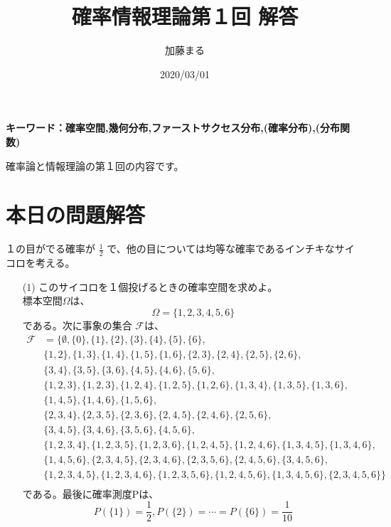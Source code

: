 \documentclass[a4j,uplatex]{jsarticle}
\title{確率情報理論第１回 解答}
\author{加藤まる}
\date{2020/03/01}
\begin{document}
\maketitle
\bf キーワード：確率空間,幾何分布,ファーストサクセス分布,(確率分布),(分布関数)
\par \rm 確率論と情報理論の第１回の内容です。

\section*{本日の問題解答}
１の目がでる確率が $\frac{1}{2}$ で、他の目については均等な確率であるインチキなサイコロを考える。
\begin{itemize}
  \item[(1)] このサイコロを１個投げるときの確率空間を求めよ。 
  \\ 
  標本空間$\Omega $は、
  \begin{equation}
    \Omega = \{ 1,2,3,4,5,6 \} 
  \end{equation}
  である。次に事象の集合 $\mathscr F$は、
  \begin{equation}
    \begin{split}
       \mathscr F &= \{ \emptyset,\{ 0 \},\{ 1\},\{ 2\},\{ 3\},\{ 4\},\{ 5\},\{ 6\},\\
      &\{ 1,2\},\{ 1,3\},\{ 1,4\},\{ 1,5\},\{ 1,6\},\{ 2,3\},\{ 2,4\},\{ 2,5\},\{ 2,6\},\\
      &\{ 3,4\},\{ 3,5\},\{ 3,6\},\{ 4,5\},\{ 4,6\},\{ 5,6\},\\
      &\{ 1,2,3\},\{ 1,2,3\},\{ 1,2,4\},\{ 1,2,5\},\{ 1,2,6\},\{ 1,3,4\},\{ 1,3,5\},\{ 1,3,6\},\\
      &\{ 1,4,5\},\{ 1,4,6\},\{ 1,5,6\},\\
      &\{ 2,3,4\},\{ 2,3,5\},\{ 2,3,6\},\{ 2,4,5\},\{ 2,4,6\},\{ 2,5,6\},\\
      &\{ 3,4,5\},\{ 3,4,6\},\{ 3,5,6\},\{ 4,5,6\},\\
      &\{ 1,2,3,4\},\{ 1,2,3,5\},\{ 1,2,3,6\},\{ 1,2,4,5\},\{ 1,2,4,6\},\{ 1,3,4,5\},\{ 1,3,4,6\},\\
      &\{ 1,4,5,6\},\{ 2,3,4,5\},\{ 2,3,4,6\},\{ 2,3,5,6\},\{ 2,4,5,6\},\{ 3,4,5,6\},\\
      &\{ 1,2,3,4,5\},\{ 1,2,3,4,6\},\{ 1,2,3,5,6\},\{ 1,2,4,5,6\},\{ 1,3,4,5,6\},\{ 2,3,4,5,6\} \}\\
    \end{split}
  \end{equation}
  である。最後に確率測度Pは、
  \begin{equation}
    P(\{1\})=\frac{1}{2},P(\{2\})= \cdots = P(\{6\}) = \frac{1}{10}
  \end{equation}


\end{itemize}
\end{document}
